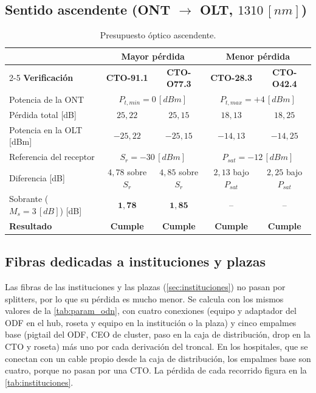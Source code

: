 \subsection{Sentido ascendente (ONT $\rightarrow$ OLT, $1310 \, [nm]$)}
\label{sec:ascendente}
\begin{table}[H]
    \centering
    \footnotesize
    \caption{Presupuesto óptico ascendente.}
    \label{tab:ascendente}
    \begin{tabular}{|l|c|c|c|c|}
        \hline
        & \multicolumn{2}{c|}{\textbf{Mayor pérdida}} & \multicolumn{2}{c|}{\textbf{Menor pérdida}} \\
        \cline{2-5}
        \textbf{Verificación} & \textbf{CTO-91.1} & \textbf{CTO-O77.3} & \textbf{CTO-28.3} & \textbf{CTO-O42.4} \\
        \hline
        Potencia de la ONT & \multicolumn{2}{c|}{$P_{t,min} = 0 \, [dBm]$} & \multicolumn{2}{c|}{$P_{t,max} = +4 \, [dBm]$} \\
        Pérdida total [dB] & $25{,}22$ & $25{,}15$ & $18{,}13$ & $18{,}25$ \\
        Potencia en la OLT [dBm] & $-25{,}22$ & $-25{,}15$ & $-14{,}13$ & $-14{,}25$ \\
        Referencia del receptor & \multicolumn{2}{c|}{$S_r = -30 \, [dBm]$} & \multicolumn{2}{c|}{$P_{sat} = -12 \, [dBm]$} \\
        Diferencia [dB] & $4{,}78$ sobre $S_r$ & $4{,}85$ sobre $S_r$ & $2{,}13$ bajo $P_{sat}$ & $2{,}25$ bajo $P_{sat}$ \\
        Sobrante ($M_s = 3 \, [dB]$) [dB] & $\mathbf{1{,}78}$ & $\mathbf{1{,}85}$ & -- & -- \\
        \hline
        \textbf{Resultado} & \textbf{Cumple} & \textbf{Cumple} & \textbf{Cumple} & \textbf{Cumple} \\
        \hline
    \end{tabular}
\end{table}

\subsection{Fibras dedicadas a instituciones y plazas}
\label{sec:presupuesto_inst}
Las fibras de las instituciones y las plazas (\autoref{sec:instituciones}) no pasan por splitters, por lo que su pérdida es mucho menor. Se calcula con los mismos valores de la \autoref{tab:param_odn}, con cuatro conexiones (equipo y adaptador del ODF en el hub, roseta y equipo en la institución o la plaza) y cinco empalmes base (pigtail del ODF, CEO de cluster, paso en la caja de distribución, drop en la CTO y roseta) más uno por cada derivación del troncal. En los hospitales, que se conectan con un cable propio desde la caja de distribución, los empalmes base son cuatro, porque no pasan por una CTO. La pérdida de cada recorrido figura en la \autoref{tab:instituciones}.

